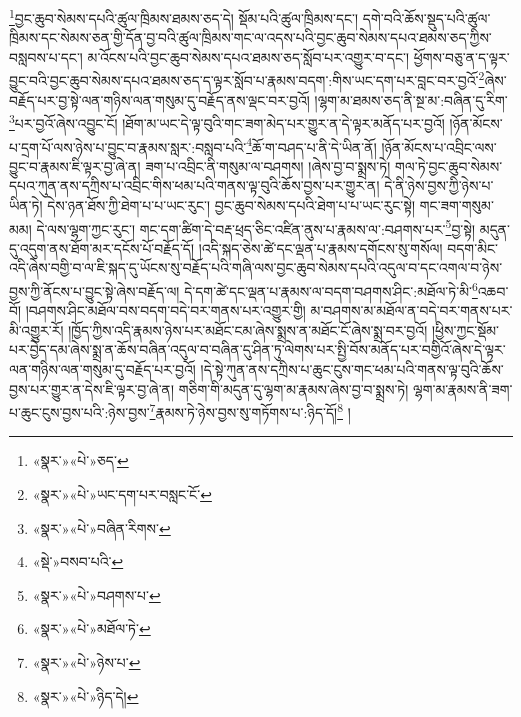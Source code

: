 \footnote{«སྣར་»«པེ་»ཅད་}བྱང་ཆུབ་སེམས་དཔའི་ཚུལ་ཁྲིམས་ཐམས་ཅད་དེ། སྡོམ་པའི་ཚུལ་ཁྲིམས་དང་། དགེ་བའི་ཆོས་སྡུད་པའི་ཚུལ་ཁྲིམས་དང་སེམས་ཅན་གྱི་དོན་བྱ་བའི་ཚུལ་ཁྲིམས་གང་ལ་འདས་པའི་བྱང་ཆུབ་སེམས་དཔའ་ཐམས་ཅད་ཀྱིས་བསླབས་པ་དང་། མ་འོངས་པའི་བྱང་ཆུབ་སེམས་དཔའ་ཐམས་ཅད་སློབ་པར་འགྱུར་བ་དང་། ཕྱོགས་བཅུ་ན་ད་ལྟར་བྱུང་བའི་བྱང་ཆུབ་སེམས་དཔའ་ཐམས་ཅད་ད་ལྟར་སློབ་པ་རྣམས་བདག་:གིས་ཡང་དག་པར་བླང་བར་བྱའོ་\footnote{«སྣར་»«པེ་»ཡང་དག་པར་བསླང་ངོ་}ཞེས་བརྗོད་པར་བྱ་སྟེ་ལན་གཉིས་ལན་གསུམ་དུ་བརྗོད་ནས་ལྡང་བར་བྱའོ། །ལྷག་མ་ཐམས་ཅད་ནི་སྔ་མ་:བཞིན་དུ་རིག་\footnote{«སྣར་»«པེ་»བཞིན་རིགས་}པར་བྱའོ་ཞེས་འབྱུང་ངོ། །ཐོག་མ་ཡང་དེ་ལྟ་བུའི་གང་ཟག་མེད་པར་གྱུར་ན་དེ་ལྟར་མནོད་པར་བྱའོ། །ཉོན་མོངས་པ་དྲག་པོ་ལས་ཉེས་པ་བྱུང་བ་རྣམས་སླར་:བསླབ་པའི་\footnote{«སྡེ་»བསབ་པའི་}ཆོ་ག་བཤད་པ་ནི་དེ་ཡིན་ནོ། །ཉོན་མོངས་པ་འབྲིང་ལས་བྱུང་བ་རྣམས་ཇི་ལྟར་བྱ་ཞེ་ན། ཟག་པ་འབྲིང་ནི་གསུམ་ལ་བཤགས། །ཞེས་བྱ་བ་སྨྲས་ཏེ། གལ་ཏེ་བྱང་ཆུབ་སེམས་དཔའ་ཀུན་ནས་དཀྲིས་པ་འབྲིང་གིས་ཕམ་པའི་གནས་ལྟ་བུའི་ཆོས་བྱས་པར་གྱུར་ན། དེ་ནི་ཉེས་བྱས་ཀྱི་ཉེས་པ་ཡིན་ཏེ། དེས་ཉན་ཐོས་ཀྱི་ཐེག་པ་པ་ཡང་རུང་། བྱང་ཆུབ་སེམས་དཔའི་ཐེག་པ་པ་ཡང་རུང་སྟེ། གང་ཟག་གསུམ་མམ། དེ་ལས་ལྷག་ཀྱང་རུང་། གང་དག་ཚིག་དེ་བརྡ་ཕྲད་ཅིང་འཛིན་ནུས་པ་རྣམས་ལ་:བཤགས་པར་\footnote{«སྣར་»«པེ་»བཤགས་པ་}བྱ་སྟེ། མདུན་དུ་འདུག་ནས་ཐོག་མར་དངོས་པོ་བརྗོད་དོ། །འདི་སྐད་ཅེས་ཚེ་དང་ལྡན་པ་རྣམས་དགོངས་སུ་གསོལ། བདག་མིང་འདི་ཞེས་བགྱི་བ་ལ་ཇི་སྐད་དུ་ཡོངས་སུ་བརྗོད་པའི་གཞི་ལས་བྱང་ཆུབ་སེམས་དཔའི་འདུལ་བ་དང་འགལ་བ་ཉེས་བྱས་ཀྱི་ནོངས་པ་བྱུང་སྟེ་ཞེས་བརྗོད་ལ། དེ་དག་ཚེ་དང་ལྡན་པ་རྣམས་ལ་བདག་བཤགས་ཤིང་:མཐོལ་ཏེ་མི་\footnote{«སྣར་»«པེ་»མཐོལ་ཏེ་}འཆབ་བོ། །བཤགས་ཤིང་མཐོལ་བས་བདག་བདེ་བར་གནས་པར་འགྱུར་གྱི། མ་བཤགས་མ་མཐོལ་ན་བདེ་བར་གནས་པར་མི་འགྱུར་རོ། །ཁྱོད་ཀྱིས་འདི་རྣམས་ཉེས་པར་མཐོང་ངམ་ཞེས་སྨྲས་ན་མཐོང་ངོ་ཞེས་སྨྲ་བར་བྱའོ། །ཕྱིས་ཀྱང་སྡོམ་པར་བྱེད་དམ་ཞེས་སྨྲ་ན་ཆོས་བཞིན་འདུལ་བ་བཞིན་དུ་ཤིན་ཏུ་ལེགས་པར་སྤྱི་བོས་མནོད་པར་བགྱིའོ་ཞེས་དེ་ལྟར་ལན་གཉིས་ལན་གསུམ་དུ་བརྗོད་པར་བྱའོ། །དེ་སྟེ་ཀུན་ནས་དཀྲིས་པ་ཆུང་ངུས་གང་ཕམ་པའི་གནས་ལྟ་བུའི་ཆོས་བྱས་པར་གྱུར་ན་དེས་ཇི་ལྟར་བྱ་ཞེ་ན། གཅིག་གི་མདུན་དུ་ལྷག་མ་རྣམས་ཞེས་བྱ་བ་སྨྲས་ཏེ། ལྷག་མ་རྣམས་ནི་ཟག་པ་ཆུང་ངུས་བྱས་པའི་:ཉེས་བྱས་\footnote{«སྣར་»«པེ་»ཉེས་པ་}རྣམས་ཏེ་ཉེས་བྱས་སུ་གཏོགས་པ་:ཉིད་དོ།\footnote{«སྣར་»«པེ་»ཉིད་དེ།} །
